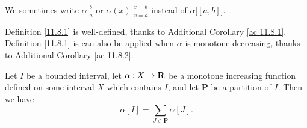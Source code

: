 \begin{note}
    We sometimes write \(\alpha\big|_a^b\) or \(\alpha(x)\big|_{x = a}^{x = b}\) instead of \(\alpha\big[[a, b]\big]\).
\end{note}

\begin{note}
    Definition \ref{11.8.1} is well-defined, thanks to Additional Corollary \ref{ac 11.8.1}.
    Definition \ref{11.8.1} is can also be applied when \(\alpha\) is monotone decreasing, thanks to Additional Corollary \ref{ac 11.8.2}.
\end{note}

\setcounter{theorem}{3}
\begin{lemma}\label{11.8.4}
    Let \(I\) be a bounded interval, let \(\alpha : X \to \mathbf{R}\) be a monotone increasing function defined on some interval \(X\) which contains \(I\), and let \(\mathbf{P}\) be a partition of \(I\).
    Then we have
    \[
        \alpha[I] = \sum_{J \in \mathbf{P}} \alpha[J].
    \]
\end{lemma}

